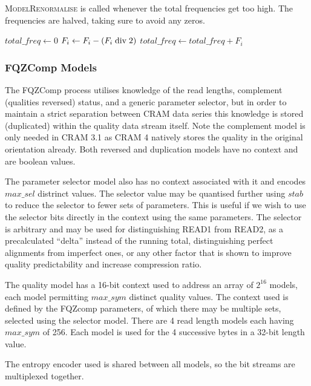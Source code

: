 \documentclass[a4paper]{article}
\begin{document}
\textsc{ModelRenormalise} is called whenever the total frequencies get too high.
The frequencies are halved, taking sure to avoid any zeros.

\begin{algorithmic}[1]
  \State $total\_freq \gets 0$
    \State $F_i \gets F_i - (F_i \bdiv 2)$
    \State $total\_freq \gets total\_freq + F_i$
  \EndFor
\EndProcedure
\end{algorithmic}

\subsubsection*{FQZComp Models}

The FQZComp process utilises knowledge of the read lengths, complement
(qualities reversed) status, and a generic parameter selector, but in
order to maintain a strict separation between CRAM data series this
knowledge is stored (duplicated) within the quality data stream
itself.  Note the complement model is only needed in CRAM 3.1 as CRAM
4 natively stores the quality in the original orientation already.
Both reversed and duplication models have no context and are boolean
values.

The parameter selector model also has no context associated with it
and encodes $max\_sel$ distrinct values.  The selector value may be
quantised further using $stab$ to reduce the selector to fewer
sets of parameters.  This is useful if we wish to use the selector
bits directly in the context using the same parameters.  The selector
is arbitrary and may be used for distinguishing READ1 from READ2, as
a precalculated ``delta'' instead of the running total, distinguishing
perfect alignments from imperfect ones, or any other factor that is
shown to improve quality predictability and increase compression
ratio.

The quality model has a 16-bit context used to address an array of
$2^{16}$ models, each model permitting $max\_sym$ distinct quality
values.  The context used is defined by the FQZcomp parameters, of
which there may be multiple sets, selected using the selector model.
There are 4 read length models each having $max\_sym$ of 256.  Each
model is used for the 4 successive bytes in a 32-bit length value.

The entropy encoder used is shared between all models, so the bit
streams are multiplexed together.
\end{document}
